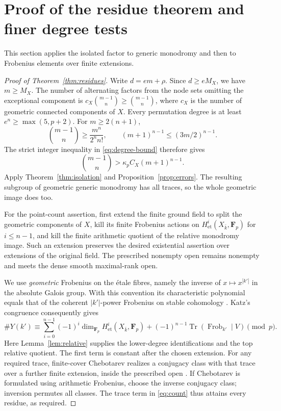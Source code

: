 \documentclass[11pt]{article}
\theoremstyle{remark}\newtheorem{remark}[theorem]{Remark}
\newcommand{\FF}{\mathbf F}
\newcommand{\et}{\mathrm{et}}
\newcommand{\Tr}{\operatorname{Tr}}
\begin{document}
\section{Proof of the residue theorem and finer degree tests}\label{sec:main-proof}

This section applies the isolated factor to generic monodromy and then to Frobenius elements over finite extensions.

\begin{proof}[Proof of Theorem~\ref{thm:residues}]
Write $d=em+\rho$. Since $d\ge eM_X$, we have $m\ge M_X$. The number of alternating factors from the node sets omitting the exceptional component is
$c_X\binom{m-1}{n}\ge\binom{m-1}{n}$, where $c_X$ is the number of geometric connected components of $X$. Every permutation degree is at least $e^n\ge\max(5,p+2)$. For $m\ge2(n+1)$,
\[
 \binom{m-1}{n}\ge\frac{m^n}{2^n n!},
                 \qquad (m+1)^{n-1}\le(3m/2)^{n-1}.
\]
The strict integer inequality in \eqref{eq:degree-bound} therefore gives
\[
               \binom{m-1}{n}>\kappa_pC_X(m+1)^{n-1}.
\]
Apply Theorem~\ref{thm:isolation} and Proposition~\ref{prop:errors}. The resulting subgroup of geometric generic monodromy has all traces, so the whole geometric image does too.

For the point-count assertion, first extend the finite ground field to split the geometric components of $X$, kill its finite Frobenius actions on $H^i_{\et}(X_{\bar k},\FF_p)$ for $i\le n-1$, and kill the finite arithmetic quotient of the relative monodromy image. Such an extension preserves the desired existential assertion over extensions of the original field. The prescribed nonempty open remains nonempty and meets the dense smooth maximal-rank open.

We use \emph{geometric} Frobenius on the \'etale fibres, namely the inverse of $x\mapsto x^{|k'|}$ in the absolute Galois group. With this convention its characteristic polynomial equals that of the coherent $|k'|$-power Frobenius on stable cohomology \citep[Propositions~2.2.4--2.2.5, pp.~407--409]{Katz}. Katz's congruence consequently gives
\begin{equation}\label{eq:count}
 \#Y(k')\equiv
 \sum_{i=0}^{n-1}(-1)^i
           \dim_{\FF_p}H^i_{\et}(X_{\bar k},\FF_p)
       +(-1)^{n-1}\Tr(\operatorname{Frob}_{k'}\mid V)\pmod p.
\end{equation}
Here Lemma~\ref{lem:relative} supplies the lower-degree identifications and the top relative quotient. The first term is constant after the chosen extension. For any required trace, finite-cover Chebotarev realizes a conjugacy class with that trace over a further finite extension, inside the prescribed open \citep[Theorem~3 and proof, pp.~9--11]{Entin}. If Chebotarev is formulated using arithmetic Frobenius, choose the inverse conjugacy class; inversion permutes all classes. The trace term in \eqref{eq:count} thus attains every residue, as required.
\end{proof}
\end{document}
